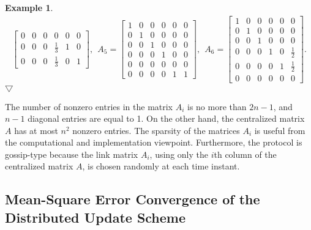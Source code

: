 \documentclass[11pt,draftcls,onecolumn]{IEEEtran}
\newtheorem{example}[theorem]{Example}
\newcommand{\End}{\hfill \mbox{$\bigtriangledown$}}
\begin{document}
\begin{example}
\begin{align*}
\begin{bmatrix}
       0 & 0           & 0           & 0 & 0 & 0\\
       0           & 0           & 0           &  \frac{1}{3} & 1 & 0\\
       0           & 0           & 0           &  \frac{1}{3} & 0 & 1
     \end{bmatrix},~~
 A_5
   = \begin{bmatrix}
       1 &  0& 0           & 0 & 0 & 0\\
       0 & 1           &   0& 0 & 0 & 0\\
       0           &  0& 1 & 0 & 0 & 0\\
       0           & 0           & 0           &  1& 0 & 0 \\
       0           & 0           & 0           & 0 & 0 &  0\\
       0           & 0           & 0           & 0 & 1 &  1
     \end{bmatrix},~~
 A_6
   = \begin{bmatrix}
       1 & 0 & 0           & 0           & 0 & 0\\
       0 & 1           & 0 & 0           & 0 & 0\\
       0 & 0 & 1           & 0 & 0 & 0\\
       0 & 0           & 0 & 1 & 0 & \frac{1}{2}\\
       0 & 0           & 0           & 0           & 1 & \frac{1}{2}\\
       0 & 0           & 0 & 0           & 0 & 0
     \end{bmatrix}.
\end{align*}
\End
\end{example}

\medskip
The number of nonzero entries in the matrix $A_i$ is no more than $2n-1$, 
and $n-1$ diagonal entries are equal to 1. On the other hand, the centralized matrix $A$ 
has at most $n^2$ nonzero entries. The sparsity of the matrices $A_i$ is useful 
from the computational and implementation viewpoint.
Furthermore, the protocol is gossip-type because 
the link matrix $A_i$, using only the $i$th column of the centralized matrix $A$,
is chosen randomly at each time instant. 



\subsection*{Mean-Square Error Convergence of the Distributed Update Scheme}
\end{document}
